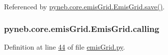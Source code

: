 Referenced by \hyperlink{emis_grid_8py_source_l00099}{pyneb.\-core.\-emis\-Grid.\-Emis\-Grid.\-save()}.

\hypertarget{classpyneb_1_1core_1_1emis_grid_1_1_emis_grid_a19820878261ee98513e0b755e688453f}{
\subsubsection[{calling}]{\setlength{\rightskip}{0pt plus 5cm}pyneb.\-core.\-emis\-Grid.\-Emis\-Grid.\-calling}}\label{classpyneb_1_1core_1_1emis_grid_1_1_emis_grid_a19820878261ee98513e0b755e688453f}


Definition at line \hyperlink{emis_grid_8py_source_l00044}{44} of file \hyperlink{emis_grid_8py_source}{emis\-Grid.\-py}.




